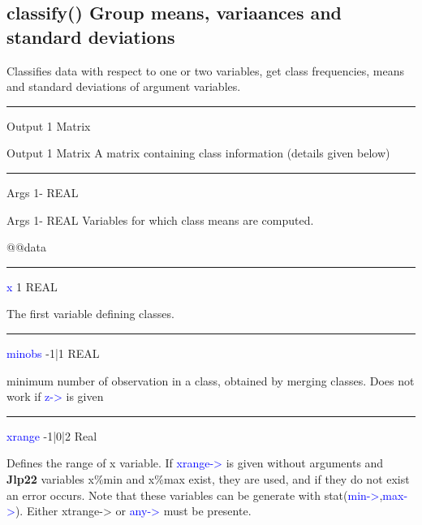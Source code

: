 \subsection{\textcolor{VioletRed}{classify}() Group means, variaances and standard deviations}
\label{classify}
Classifies data with respect to one or two variables, get class
frequencies,
means and standard deviations of
argument variables.
\vspace{0.3cm}
\hrule
\vspace{0.3cm}
\noindent Output \tabto{3cm}  1 \tabto{5cm}  Matrix \tabto{7cm}
\begin{changemargin}{3cm}{0cm}
\noindent \noindent Output \tabto{3cm}  1 \tabto{5cm}  Matrix \tabto{7cm}
A matrix containing class information (details given below)
\end{changemargin}
\vspace{0.3cm}
\hrule
\vspace{0.3cm}
\noindent Args \tabto{3cm} 1- \tabto{5cm}  REAL \tabto{7cm}
\begin{changemargin}{3cm}{0cm}
\noindent \noindent Args \tabto{3cm} 1- \tabto{5cm}  REAL \tabto{7cm}
Variables for which class means are computed.

@@data
\end{changemargin}
\vspace{0.3cm}
\hrule
\vspace{0.3cm}
\noindent \textcolor{blue}{x}  \tabto{3cm} 1 \tabto{5cm}  REAL \tabto{7cm}
\begin{changemargin}{3cm}{0cm}
\noindent The first variable defining classes.
\end{changemargin}
\vspace{0.3cm}
\hrule
\vspace{0.3cm}
\noindent \textcolor{blue}{minobs} \tabto{3cm} -1|1 \tabto{5cm}  REAL \tabto{7cm}
\begin{changemargin}{3cm}{0cm}
\noindent  minimum number of observation in a class, obtained by merging classes. Does
not work if \textcolor{blue}{z->} is given

\end{changemargin}
\vspace{0.3cm}
\hrule
\vspace{0.3cm}
\noindent \textcolor{blue}{xrange} \tabto{3cm}  -1|0|2 \tabto{5cm}  Real \tabto{7cm}
\begin{changemargin}{3cm}{0cm}
\noindent  Defines the range of x variable. If \textcolor{blue}{xrange->} is given without
arguments and \textbf{Jlp22} variables x\%min and x\%max exist, they are used, and
if they do not exist an error occurs. Note that these variables can be
generate with \textcolor{VioletRed}{stat}(\textcolor{blue}{min->},\textcolor{blue}{max->}). Either xtrange-> or \textcolor{blue}{any->} must be presente.
\end{changemargin}
